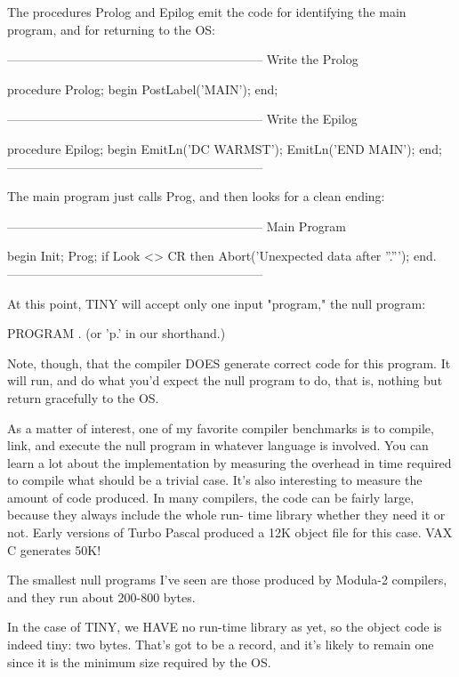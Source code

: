 \documentclass[float=false, crop=false]{standalone}
\begin{document}
The procedures Prolog and  Epilog  emit  the code for identifying
the main program, and for returning to the OS:

\begin{code}
{--------------------------------------------------------------}
{ Write the Prolog }

procedure Prolog;
begin
   PostLabel('MAIN');
end;


{--------------------------------------------------------------}
{ Write the Epilog }

procedure Epilog;
begin
   EmitLn('DC WARMST');
   EmitLn('END MAIN');
end;
{--------------------------------------------------------------}
\end{code}

The main program just calls Prog, and then looks for a clean ending:

\begin{code}
{--------------------------------------------------------------}
{ Main Program }

begin
   Init;
   Prog;
   if Look <> CR then Abort('Unexpected data after ''.''');
end.
{--------------------------------------------------------------}
\end{code}

At this point, TINY  will  accept  only  one input "program," the
null program:


     PROGRAM .   (or 'p.' in our shorthand.)

Note, though, that the  compiler  DOES  generate correct code for
this program.  It will run, and do  what  you'd  expect  the null
program to do, that is, nothing but return gracefully to the OS.

As a matter of interest, one of my favorite compiler benchmarks is to compile,
link, and execute the null program in whatever language is involved. You can
learn a lot about the implementation by measuring the overhead in time required
to compile what should be a trivial case. It's also interesting to measure the
amount of code produced. In many compilers, the code can be fairly large,
because they always include the whole run- time library whether they need it or
not. Early versions of Turbo Pascal produced a 12K object file for this case.
VAX C generates 50K!

The smallest null programs I've seen are those produced by Modula-2 compilers,
and they run about 200-800 bytes.

In the case of TINY, we HAVE no run-time library as yet, so the object code is
indeed tiny: two bytes. That's got to be a record, and it's likely to remain one
since it is the minimum size required by the OS.
\end{document}
